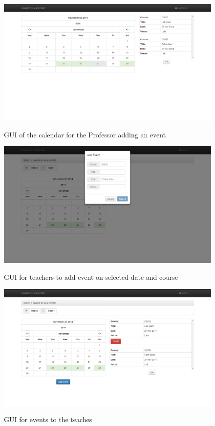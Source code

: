 \documentclass[a4paper, 12pt]{article}
\begin{document}
\begin{figure}[H]
	\caption{GUI of the calendar for the Professor adding an event}
	\vspace{.5cm}
	\includegraphics[width=0.95\columnwidth]{student_event}
	\label{fig:figure2}
\end{figure}

 
\begin{figure}[H]
	\caption{GUI for teachers to add event on selected date and course}
	\vspace{.5cm}
	\includegraphics[width=0.95\columnwidth]{teacher_add_event}
	\label{fig:figure3}
\end{figure}
 
\begin{figure}[H]
	\caption{GUI for events to the teaches}
	\vspace{.5cm}
	\includegraphics[width=0.95\columnwidth]{teacher_show_event}
	\label{fig:figure4}
\end{figure}
\end{document}
